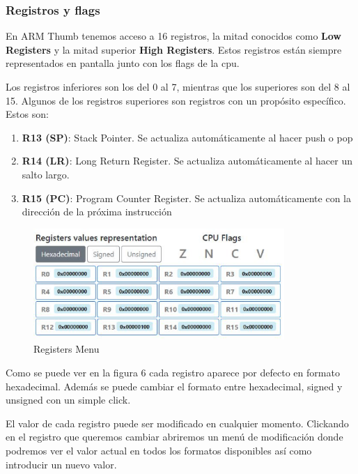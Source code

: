 {        \subsubsection{Registros y flags}
        {
            En ARM Thumb tenemos acceso a 16 registros, la mitad conocidos como \textbf{Low Registers} y la mitad superior \textbf{High Registers}.
            Estos registros están siempre representados en pantalla junto con los flags de la cpu. 

            Los registros inferiores son los del 0 al 7, mientras que los superiores son del 8 al 15.
            Algunos de los registros superiores son registros con un propósito específico. Estos son:
            \begin{enumerate}
                \item \textbf{R13 (SP)}: Stack Pointer. Se actualiza automáticamente al hacer push o pop
                \item \textbf{R14 (LR)}: Long Return Register. Se actualiza automáticamente al hacer un salto largo.
                \item \textbf{R15 (PC)}: Program Counter Register. Se actualiza automáticamente con la dirección de la próxima instrucción
            \end{enumerate}
            \clearpage

            \begin{figure}[h]
                \centering
                \includegraphics[width=0.85\textwidth]{images/registers}
                \caption{Registers Menu}
            \end{figure}

            Como se puede ver en la figura 6 cada registro aparece por defecto en formato hexadecimal.
            Además se puede cambiar el formato entre hexadecimal, signed y unsigned con un simple click.

            El valor de cada registro puede ser modificado en cualquier momento. Clickando en el registro
            que queremos cambiar abriremos un menú de modificación donde podremos ver el valor actual en
            todos los formatos disponibles así como introducir un nuevo valor.

}}
